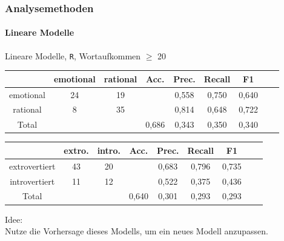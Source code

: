 \begin{frame}
\frametitle{Analysemethoden}
\framesubtitle{Lineare Modelle}
\begin{center}
Lineare Modelle, \texttt{R}, Wortaufkommen $\geq$ 20\\
\bigskip
\begin{tabular}{|c|c|c|c|c|c|c|c|c|}
\hline
				& emotional 	& rational	&  Acc.	& Prec. & Recall	& F1\\
\hline
emotional 		& 24			& 19 		&       & 0,558	& 0,750 	& 0,640\\
rational	 	& 8 			& 35		& 		& 0,814	& 0,648 	& 0,722\\
\hline
Total 			& 				& 			& 0,686	& 0,343	& 0,350  	& 0,340\\
\hline
\end{tabular}
\end{center}

\begin{center}
\bigskip
\begin{tabular}{|c|c|c|c|c|c|c|c|c|}
\hline
				& extro. 	& intro.	&  Acc.	& Prec. 	& Recall	& F1\\
\hline
extrovertiert	& 43		& 20		&       & 0,683 	& 0,796 	& 0,735\\
introvertiert 	& 11 		& 12		& 		& 0,522 	& 0,375 	& 0,436\\
\hline
Total 			& 			& 			& 0,640	& 0,301		& 0,293  	& 0,293\\
\hline
\end{tabular}
\end{center}

\vspace{12pt}
 
 Idee:\\
 Nutze die Vorhersage dieses Modells, um ein neues Modell anzupassen. 
 \end{frame}

